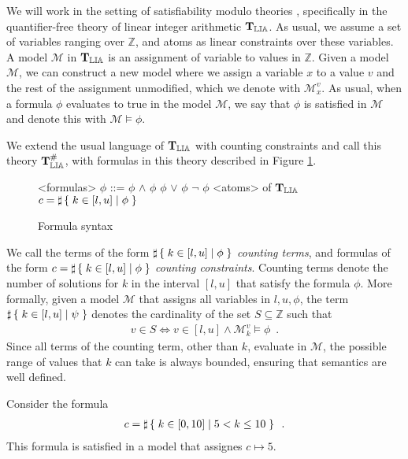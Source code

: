
We will work in the setting of satisfiability modulo theories
\cite{barrett2009satisfiability}, specifically in the quantifier-free
theory of linear integer arithmetic $\operatorname{\mathbf{T}_\mathbb{LIA}}$. As usual, we assume a
set of variables ranging over $\mathbb{Z}$, and atoms as linear
constraints over these variables. A model $\mathcal{M}$ in $\operatorname{\mathbf{T}_\mathbb{LIA}}$ is
an assignment of variable to values in $\mathbb{Z}$. Given a model
$\mathcal{M}$, we can construct a new model where we assign a variable
$x$ to a value $v$ and the rest of the assignment unmodified, which we
denote with $\mathcal{M}^v_x$. As usual, when a formula $\phi$
evaluates to true in the model $\mathcal{M}$, we say that $\phi$ is
satisfied in $\mathcal{M}$ and denote this with $\mathcal{M} \vDash
\phi$.

We extend the usual language of $\operatorname{\mathbf{T}_\mathbb{LIA}}$ with counting constraints and
call this theory $\operatorname{\mathbf{T}^\#_\mathbb{LIA}}$, with formulas in this theory described in
Figure \ref{formula}.

\begin{figure}[h]
\begin{grammar}
<formulas> $\phi$ ::= $\phi$ $\land$ $\phi$
\alt $\phi$ $\lor$ $\phi$
\alt $\lnot$ $\phi$
\alt <atoms> of $\operatorname{\mathbf{T}_\mathbb{LIA}}$
\alt $c = \sharp\left\lbrace\;k \in [l, u] \;|\;\phi\;\right\rbrace$
\end{grammar}

\caption{Formula syntax}
\label{formula}
\end{figure}

We call the terms of the form $\sharp\left\lbrace\;k \in [l, u] \;|\;\phi\;\right\rbrace$ \emph{counting
terms}, and formulas of the form $c = \sharp\left\lbrace\;k \in [l, u] \;|\;\phi\;\right\rbrace$
\emph{counting constraints}. Counting terms denote the number of
solutions for $k$ in the interval $[l, u]$ that satisfy the formula
$\phi$. More
formally, given a model $\mathcal{M}$ that assigns all variables in
$l, u, \phi$, the term $\sharp\left\lbrace\;k \in [l, u] \;|\;\psi\;\right\rbrace$ denotes the cardinality of
the set $S \subseteq \mathbb{Z}$ such that
\begin{align*}
  v \in S \iff v \in [l, u] \land \mathcal{M}^v_k \vDash \phi\enspace.
\end{align*}
Since all terms of the counting term, other than $k$, evaluate in
$\mathcal{M}$, the possible range of values that $k$ can take is
always bounded, ensuring that semantics are well defined.

\begin{example}
\label{ex:semantics}
Consider the formula
\begin{align*}
  c = \sharp\left\lbrace\;k \in [0, 10] \;|\;5 < k \le 10\;\right\rbrace\enspace.
\end{align*}
This formula is satisfied in a model that assignes $c \mapsto 5$.
\end{example}

